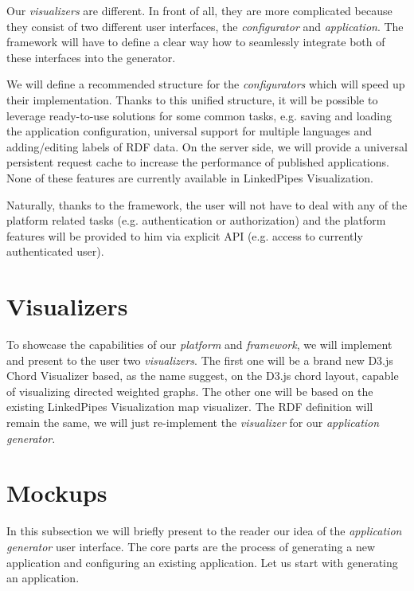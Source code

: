 Our \emph{visualizers} are different. In front of all, they are more complicated because they consist of two different user interfaces, the \emph{configurator} and \emph{application}. The framework will have to define a clear way how to seamlessly integrate both of these interfaces into the generator.

We will define a recommended structure for the \emph{configurators} which will speed up their implementation. Thanks to this unified structure, it will be possible to leverage ready-to-use solutions for some common tasks, e.g. saving and loading the application configuration, universal support for multiple languages and adding/editing labels of RDF data. On the server side, we will provide a universal persistent request cache to increase the performance of published applications. None of these features are currently available in LinkedPipes Visualization.

Naturally, thanks to the framework, the user will not have to deal with any of the platform related tasks (e.g. authentication or authorization) and the platform features will be provided to him via explicit API (e.g. access to currently authenticated user).

\section{Visualizers}

To showcase the capabilities of our \emph{platform} and \emph{framework}, we will implement and present to the user two \emph{visualizers}. The first one will be a brand new D3.js Chord Visualizer based, as the name suggest, on the D3.js chord layout, capable of visualizing directed weighted graphs. The other one will be based on the existing LinkedPipes Visualization map visualizer. The RDF definition will remain the same, we will just re-implement the \emph{visualizer} for our \emph{application generator}.

\section{Mockups}

In this subsection we will briefly present to the reader our idea of  the \emph{application generator} user interface. The core parts are the process of generating a new application and configuring an existing application. Let us start with generating an application.

